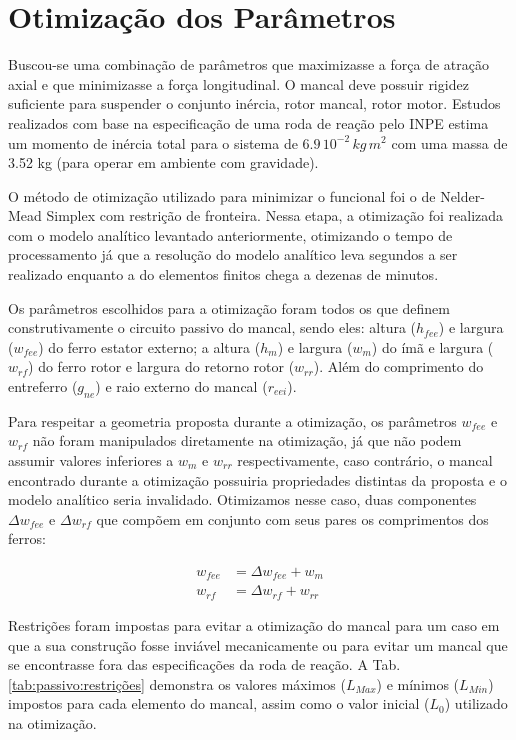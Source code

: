 \section{Otimização dos Parâmetros}

Buscou-se uma combinação de parâmetros que maximizasse a força de atração axial e que minimizasse a força longitudinal. O mancal deve possuir rigidez suficiente para suspender o conjunto inércia, rotor mancal, rotor motor. Estudos realizados com base na especificação de uma roda de reação pelo INPE estima um momento de inércia total para o sistema de $6.9 \, 10^{-2} \, kg \, m^2$ com uma massa de 3.52 kg (para operar em ambiente com gravidade). 

O método de otimização utilizado para minimizar o funcional foi o de Nelder-Mead Simplex com restrição de fronteira. Nessa etapa, a otimização foi realizada com o modelo analítico levantado anteriormente, otimizando o tempo de processamento já que a resolução do modelo analítico leva segundos a ser realizado enquanto a do elementos finitos chega a dezenas de minutos.

Os parâmetros escolhidos para a otimização foram todos os que definem construtivamente o circuito passivo do mancal, sendo eles: altura  ($h_{fee}$) e largura  ($w_{fee}$) do ferro estator externo; a altura ($h_m$) e largura ($w_m$) do ímã e largura ($w_{rf}$) do ferro rotor e largura do retorno rotor ($w_{rr}$). Além do comprimento do entreferro ($g_{ne}$) e raio externo do mancal ($r_{eei}$).

Para respeitar a geometria proposta durante a otimização, os parâmetros $w_{fee}$ e $w_{rf}$ não foram manipulados diretamente na otimização, já que não podem assumir valores inferiores a $w_m$ e $w_{rr}$ respectivamente, caso contrário, o mancal encontrado durante a otimização possuiria propriedades distintas da proposta e o modelo analítico seria invalidado. Otimizamos nesse caso, duas componentes $\Delta w_{fee}$ e $\Delta w_{rf}$ que compõem em conjunto com seus pares os comprimentos dos ferros:

\begin{align}
w_{fee}  &= \Delta w_{fee} + w_m \\
w_{rf} &= \Delta w_{rf} + w_{rr}
\end{align}	

Restrições foram impostas para evitar a otimização do mancal para um caso em que a sua construção fosse inviável mecanicamente ou para evitar um mancal que se encontrasse fora das especificações da roda de reação. A Tab. \ref{tab:passivo:restrições} demonstra os valores máximos ($L_{Max}$) e mínimos ($L_{Min}$) impostos para cada elemento do mancal, assim como o valor inicial ($L_0$) utilizado na otimização.


